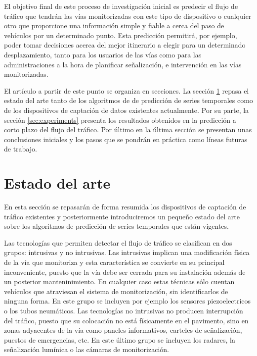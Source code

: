 \documentclass[runningheads]{llncs}
\begin{document}
El objetivo final de este proceso de investigación inicial es predecir el flujo de tráfico que
tendrán las vías monitorizadas con este tipo de dispositivo o cualquier otro que proporcione una
información simple y fiable a cerca del paso de vehículos por un determinado punto. Esta predicción
permitirá, por ejemplo, poder tomar decisiones
acerca del mejor itinerario a elegir para un determinado desplazamiento, tanto para los usuarios
de las vías como para las administraciones a la hora de planificar señalización, e intervención en
las vías monitorizadas.

El artículo a partir de este punto se organiza en secciones. La sección \ref{sec:soa} repasa el
estado del arte tanto de los algoritmos de de predicción de series temporales como de los
dispositivos de captación de datos existentes actualmente. Por su parte, la sección
\ref{sec:experiments} presenta los resultados obtenidos en la
predicción a corto plazo del flujo del tráfico. Por último en la última sección se presentan
unas conclusiones iniciales y los pasos que se pondrán en práctica como líneas
futuras de trabajo.


\section{Estado del arte}
\label{sec:soa}

En esta sección se repasarán de forma resumida los dispositivos de captación de tráfico existentes
y posteriormente introduciremos un pequeño estado del arte sobre los algoritmos de predicción de
series temporales que están vigentes. 

Las tecnologías que permiten detectar el flujo de tráfico se clasifican en dos grupos:
intrusivas y no intrusivas.  Las intrusivas implican una modificación física de la vía que
monitoriza y esta característica se convierte en su principal inconveniente, puesto que la vía debe
ser cerrada para su instalación además de un posterior manteninimiento.  En cualquier caso estas
técnicas sólo cuentan vehículos que atraviesan el sistema de monitorización, sin identificarlos de
ninguna forma. En este grupo se incluyen por ejemplo los sensores piezoelectricos o los tubos
neumáticos. Las tecnologías no intrusivas no producen interrupción del tráfico, puesto que su
colocación no está físicamente en el pavimento, sino en zonas adyacentes de la vía como paneles
informativos, carteles de señalización, puestos de emergencias, etc.  En este último grupo se
incluyen los radares, la señalización lumínica o las cámaras de monitorización. 
\end{document}
